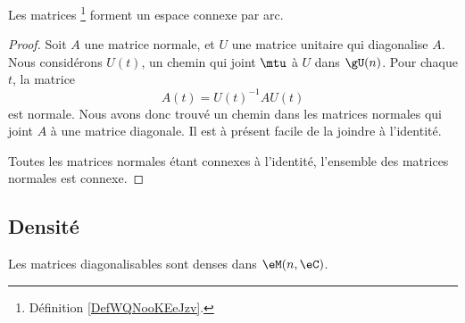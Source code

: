 \begin{theorem}
    Les matrices \footnote{Définition \ref{DefWQNooKEeJzv}.} forment un espace connexe par arc.
\end{theorem}

\begin{proof}
    Soit \( A\) une matrice normale, et \( U\) une matrice unitaire qui diagonalise \( A\). Nous considérons \( U(t)\), un chemin qui joint \( \mtu\) à \( U\) dans \( \gU(n)\). Pour chaque \( t\), la matrice
    \begin{equation}
        A(t)=U(t)^{-1} AU(t)
    \end{equation}
    est normale. Nous avons donc trouvé un chemin dans les matrices normales qui joint \( A\) à une matrice diagonale. Il est à présent facile de la joindre à l'identité.

    Toutes les matrices normales étant connexes à l'identité, l'ensemble des matrices normales est connexe.
\end{proof}

\subsection{Densité}

\begin{proposition}     \label{PropDigDensVxzPuo}
    Les matrices diagonalisables sont denses dans \( \eM(n,\eC)\).
\end{proposition}

